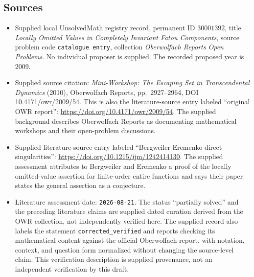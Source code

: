 \documentclass[11pt]{article}
\begin{document}
\subsection{Sources}
\begin{itemize}
\item Supplied local UnsolvedMath registry record, permanent ID \(30001392\), title \emph{Locally Omitted Values in Completely Invariant Fatou Components}, source problem code \texttt{catalogue entry}, collection \emph{Oberwolfach Reports Open Problems}. No individual proposer is supplied. The recorded proposed year is 2009.
\item Supplied source citation: \emph{Mini-Workshop: The Escaping Set in Transcendental Dynamics} (2010), Oberwolfach Reports, pp.~2927--2964, DOI 10.4171/owr/2009/54. This is also the literature-source entry labeled ``original OWR report'': \url{https://doi.org/10.4171/owr/2009/54}. The supplied background describes Oberwolfach Reports as documenting mathematical workshops and their open-problem discussions.
\item Supplied literature-source entry labeled ``Bergweiler Eremenko direct singularities'': \url{https://doi.org/10.1215/ijm/1242414130}. The supplied assessment attributes to Bergweiler and Eremenko a proof of the locally omitted-value assertion for finite-order entire functions and says their paper states the general assertion as a conjecture.
\item Literature assessment date: \texttt{2026-08-21}. The status ``partially solved'' and the preceding literature claims are supplied dated curation derived from the OWR collection, not independently verified here. The supplied record also labels the statement \texttt{corrected\_verified} and reports checking its mathematical content against the official Oberwolfach report, with notation, context, and question form normalized without changing the source-level claim. This verification description is supplied provenance, not an independent verification by this draft.
\end{itemize}
\end{document}
